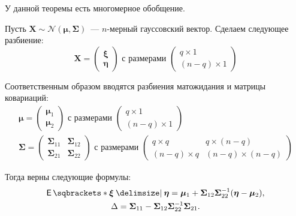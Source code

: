 У данной теоремы есть многомерное обобщение.
\begin{theorem}\label{normal-correlation-theorem}
	Пусть \(\mathbf{X} \sim \mathcal{N}(\bm{\mu}, \bm{\Sigma})\)~--- 
	\(n\)-мерный гауссовский вектор. Сделаем следующее разбиение:
	\[
		\mathbf{X} = \begin{pmatrix}
		\bm{\xi} \\ \bm{\eta}
		\end{pmatrix} \text{ с размерами }
		\begin{pmatrix}
		q \times 1 \\
		(n - q) \times 1
		\end{pmatrix}
	\]
	
	Соответственным образом вводятся разбиения матожидания и матрицы ковариаций:
	\begin{gather}
		\bm{\mu} = \begin{pmatrix}
		\bm{\mu}_{1} \\ \bm{\mu}_{2}
		\end{pmatrix} \text{ с размерами }
		\begin{pmatrix}
		q \times 1 \\
		(n - q) \times 1
		\end{pmatrix} \\
		\bm{\Sigma} = \begin{pmatrix}
		\bm{\Sigma}_{11} & \bm{\Sigma}_{12} \\
		\bm{\Sigma}_{21} & \bm{\Sigma}_{22}
		\end{pmatrix} \text{ с размерами }
		\begin{pmatrix}
		q \times q & q \times (n - q) \\
		(n - q) \times q & (n - q) \times (n - q)
		\end{pmatrix}
	\end{gather}
	
	Тогда верны следующие формулы:
	\begin{gather}
		\E{\bm{\xi} \given \bm{\eta}} = \bm{\mu}_{1} + 
		\bm{\Sigma}_{12}\bm{\Sigma}_{22}^{-1}(\bm{\eta} - \bm{\mu}_{2}), \\
		\Delta = \bm{\Sigma}_{11} - 
		\bm{\Sigma}_{12}\bm{\Sigma}_{22}^{-1}\bm{\Sigma}_{21}.
	\end{gather}
\end{theorem}
